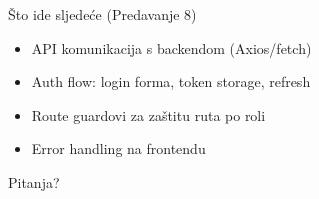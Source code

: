 \begin{frame}{Što ide sljedeće (Predavanje 8)}
\begin{itemize}
  \item API komunikacija s backendom (Axios/fetch)
  \item Auth flow: login forma, token storage, refresh
  \item Route guardovi za zaštitu ruta po roli
  \item Error handling na frontendu
\end{itemize}

\vspace{0.8em}
\begin{center}
\Large Pitanja?
\end{center}
\end{frame}


